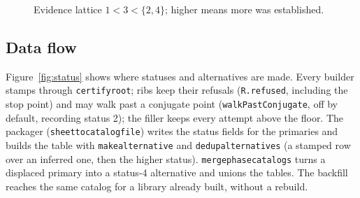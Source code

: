 \documentclass[11pt]{article}
\renewcommand{\_}{\textunderscore\allowbreak}
\newcommand{\code}[1]{\texttt{#1}}
\begin{document}
\begin{figure}[h]
\centering
{}
\caption{Evidence lattice $1<3<\{2,4\}$; higher means more was established.}
\label{fig:lattice}
\end{figure}

\subsection{Data flow}

Figure~\ref{fig:status} shows where statuses and alternatives are made.
Every builder stamps through \code{certify\_root}; ribs keep their refusals
(\code{R.refused}, including the stop point) and may walk past a conjugate
point (\code{walkPastConjugate}, off by default, recording status 2); the
filler keeps every attempt above the floor. The packager
(\code{sheet\_to\_catalog\_file}) writes the status fields for the primaries
and builds the table with \code{make\_alternative} and
\code{dedup\_alternatives} (a stamped row over an inferred one, then the
higher status). \code{merge\_phase\_catalogs} turns a displaced primary into a
status-4 alternative and unions the tables. The backfill reaches the same
catalog for a library already built, without a rebuild.
\end{document}
